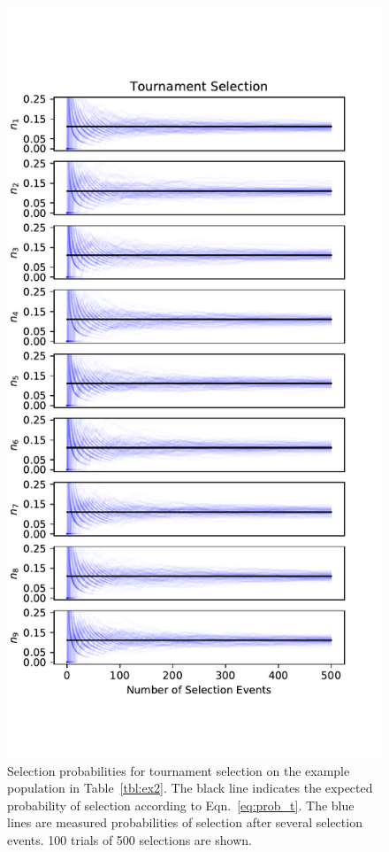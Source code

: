 \documentclass[twoside]{article}
\begin{document}
\begin{figure}
\begin{minipage}{0.49\textwidth}
\centering
  \includegraphics[width=\textwidth]{figs/tournament_probability_convergence_500selections.pdf}
  \caption{Selection probabilities for tournament selection on the example population in Table~\ref{tbl:ex2}. The black line indicates the expected probability of selection according to Eqn.~\ref{eq:prob_t}. The blue lines are measured probabilities of selection after several selection events. 100 trials of 500 selections are shown.} \label{fig:prob_converge_tourn}
  \end{minipage}
\end{figure}
\end{document}
